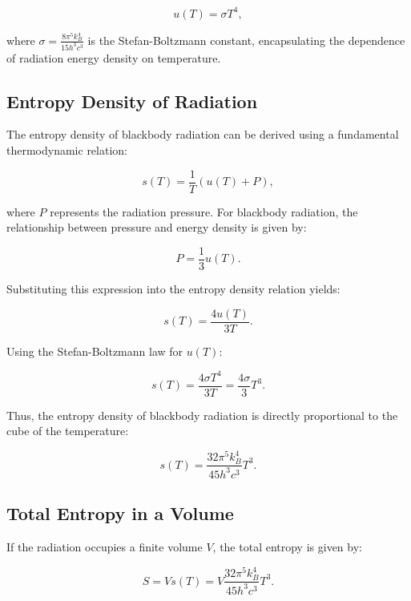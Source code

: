  \begin{equation}
  u(T) = \sigma T^4,
 \end{equation}

 where $\sigma = \frac{8 \pi^5 k_B^4}{15 h^3 c^3}$ is the Stefan-Boltzmann constant, encapsulating the dependence of radiation energy density on temperature.

 \subsection*{Entropy Density of Radiation}
 The entropy density of blackbody radiation can be derived using a fundamental thermodynamic relation:

 \begin{equation}
  s(T) = \frac{1}{T} \left( u(T) + P \right),
 \end{equation}

 where $P$ represents the radiation pressure. For blackbody radiation, the relationship between pressure and energy density is given by:

 \begin{equation}
  P = \frac{1}{3} u(T).
 \end{equation}

 Substituting this expression into the entropy density relation yields:

 \begin{equation}
  s(T) = \frac{4 u(T)}{3 T}.
 \end{equation}

 Using the Stefan-Boltzmann law for $u(T)$:

 \begin{equation}
  s(T) = \frac{4 \sigma T^4}{3 T} = \frac{4 \sigma}{3} T^3.
 \end{equation}

 Thus, the entropy density of blackbody radiation is directly proportional to the cube of the temperature:

 \begin{equation}
  s(T) = \frac{32 \pi^5 k_B^4}{45 h^3 c^3} T^3.
 \end{equation}

 \subsection*{Total Entropy in a Volume}
 If the radiation occupies a finite volume $V$, the total entropy is given by:

 \begin{equation}
  S = V s(T) = V \frac{32 \pi^5 k_B^4}{45 h^3 c^3} T^3.
 \end{equation}

